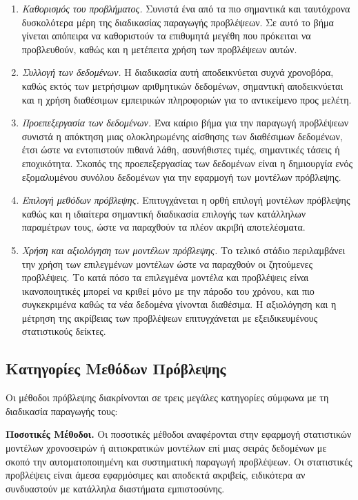 \documentclass[diploma]{softlab-thesis}
\begin{document}
\begin{enumerate}
    \item \textit{Καθορισμός του προβλήματος.} Συνιστά ένα από τα πιο σημαντικά και ταυτόχρονα δυσκολότερα μέρη της διαδικασίας παραγωγής προβλέψεων. Σε αυτό το βήμα γίνεται απόπειρα να καθοριστούν τα επιθυμητά μεγέθη που πρόκειται να προβλευθούν, καθώς και η μετέπειτα χρήση των προβλέψεων αυτών.
    \item \textit{Συλλογή των δεδομένων.} Η διαδικασία αυτή αποδεικνύεται συχνά χρονοβόρα, καθώς εκτός των μετρήσιμων αριθμητικών δεδομένων, σημαντική αποδεικνύεται και η χρήση διαθέσιμων εμπειρικών πληροφοριών για το αντικείμενο προς μελέτη. 
    \item \textit{Προεπεξεργασία των δεδομένων.} Ένα καίριο βήμα για την παραγωγή προβλέψεων συνιστά η απόκτηση μιας ολοκληρωμένης αίσθησης των διαθέσιμων δεδομένων, έτσι ώστε να εντοπιστούν πιθανά λάθη, ασυνήθιστες τιμές, σημαντικές τάσεις ή εποχικότητα. Σκοπός της προεπεξεργασίας των δεδομένων είναι η δημιουργία ενός εξομαλυμένου συνόλου δεδομένων για την εφαρμογή των μοντέλων πρόβλεψης.
     \item \textit{Επιλογή μεθόδων πρόβλεψης.} Επιτυγχάνεται η ορθή επιλογή μοντέλων πρόβλεψης καθώς και η ιδιαίτερα σημαντική διαδικασία επιλογής των κατάλληλων παραμέτρων τους, ώστε να παραχθούν τα πλέον ακριβή αποτελέσματα. 
      \item \textit{Χρήση και αξιολόγηση των μοντέλων πρόβλεψης.} Το τελικό στάδιο περιλαμβάνει την χρήση των επιλεγμένων μοντέλων ώστε να παραχθούν οι ζητούμενες προβλέψεις. Το κατά πόσο τα επιλεγμένα μοντέλα και προβλέψεις είναι ικανοποιητικές μπορεί να κριθεί μόνο με την πάροδο του χρόνου, και πιο συγκεκριμένα καθώς τα νέα δεδομένα γίνονται διαθέσιμα. Η αξιολόγηση και η μέτρηση της ακρίβειας των προβλέψεων επιτυγχάνεται με εξειδικευμένους στατιστικούς δείκτες.
\end{enumerate}

\subsection{Κατηγορίες Μεθόδων Πρόβλεψης}

Οι μέθοδοι πρόβλεψης διακρίνονται σε τρεις μεγάλες κατηγορίες σύμφωνα με τη διαδικασία παραγωγής τους:

\textbf{Ποσοτικές Μέθοδοι.} Οι ποσοτικές μέθοδοι αναφέρονται στην εφαρμογή στατιστικών μοντέλων χρονοσειρών ή αιτιοκρατικών μοντέλων επί μιας σειράς δεδομένων με σκοπό την αυτοματοποιημένη και συστηματική παραγωγή προβλέψεων. Οι στατιστικές προβλέψεις είναι άμεσα εφαρμόσιμες και αποδεκτά ακριβείς, ειδικότερα αν συνδυαστούν με κατάλληλα διαστήματα εμπιστοσύνης.
\end{document}
